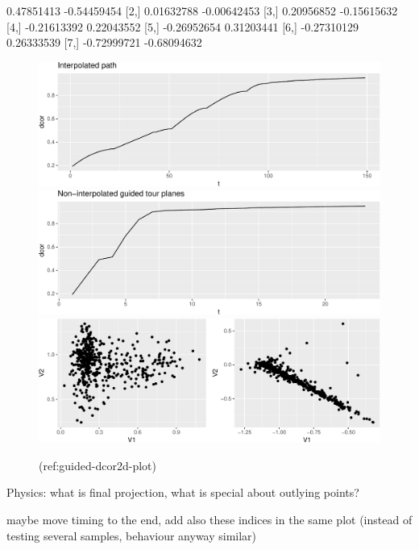 \documentclass[article]{jss}
\begin{document}
\begin{CodeChunk}

\begin{CodeOutput}
            [,1]        [,2]
[1,]  0.47851413 -0.54459454
[2,]  0.01632788 -0.00642453
[3,]  0.20956852 -0.15615632
[4,] -0.21613392  0.22043552
[5,] -0.26952654  0.31203441
[6,] -0.27310129  0.26333539
[7,] -0.72999721 -0.68094632
\end{CodeOutput}
\begin{figure}

{\centering \includegraphics[width=\textwidth]{figure/guided-dcor2d-plot-1} \includegraphics[width=\textwidth]{figure/guided-dcor2d-plot-2} \includegraphics[width=\textwidth]{figure/guided-dcor2d-plot-3} 

}

\caption[(ref:guided-dcor2d-plot)]{(ref:guided-dcor2d-plot)}\label{fig:guided-dcor2d-plot}
\end{figure}
\end{CodeChunk}

Physics: what is final projection, what is special about outlying
points?

maybe move timing to the end, add also these indices in the same plot
(instead of testing several samples, behaviour anyway similar)
\end{document}
